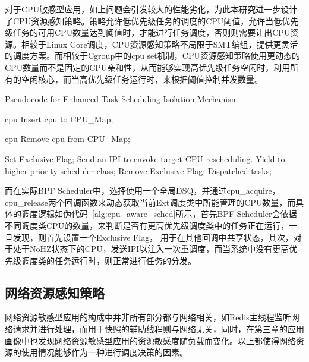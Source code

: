 对于CPU敏感型应用，如上问题会引发较大的性能劣化，为此本研究进一步设计了CPU资源感知策略。策略允许低优先级任务的调度的CPU阈值，允许当低优先级任务的可用CPU数量达到阈值时，才能进行任务调度，否则则需要让出CPU资源。相较于Linux Core调度，CPU资源感知策略不局限于SMT编组，提供更灵活的调度方案。而相较于Cgroup中的cpu set机制，CPU资源感知策略使用更动态的CPU数量而不是固定的CPU亲和性，从而能够实现高优先级任务空闲时，利用所有的空闲核心，而当高优先级任务运行时，来根据阈值控制并发数量。

\begin{algorithm}
    \caption{Pseudocode for Enhanced Task Scheduling Isolation Mechanism}
    \label{alg:cpu_aware_sched}
    \begin{algorithmic}[1]
    
     {cpu}
    \State Insert cpu to CPU\_Map;
    \EndFunction
    
     {cpu}
    \State Remove cpu from CPU\_Map;
    \EndFunction
    
                \State Set Exclusive Flag;
                    \State Send an IPI to envoke target CPU rescheduling.
                \EndFor
                \State Yield to higher priority scheduler class;
            \EndIf
            \State Remove Exclusive Flag;
            \State Dispatched tasks;
        \EndWhile
    \EndFunction
    \end{algorithmic}
\end{algorithm}

而在实际BPF Scheduler中，选择使用一个全局DSQ，并通过cpu\_acquire，cpu\_release两个回调函数来动态获取当前Ext调度类中所能管理的CPU数量，而具体的调度逻辑如伪代码~\ref{alg:cpu_aware_sched}所示，首先BPF Scheduler会依据不同调度类CPU的数量，来判断是否有更高优先级调度类中的任务正在运行，一旦发现，则首先设置一个Exclusive Flag， 用于在其他回调中共享状态，其次，对于处于NoHZ状态下的CPU，发送IPI以注入一次重调度，而当系统中没有更高优先级调度类的任务运行时，则正常进行任务的分发。

\subsection{网络资源感知策略}


网络资源敏感型应用的构成中并非所有部分都与网络相关，如Redis主线程监听网络请求并进行处理，而用于快照的辅助线程则与网络无关，同时，在第三章的应用画像中也发现网络资源敏感型应用的资源敏感度随负载而变化。以上都使得网络资源的使用情况能够作为一种进行调度决策的因素。

